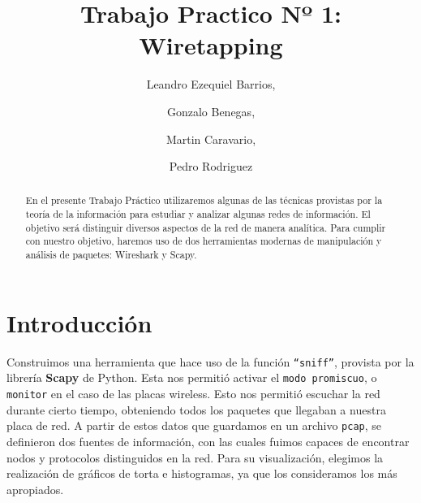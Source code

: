 \documentclass[final,narroweqnarray,inline]{ieee}
\begin{document}
\title[Trabajo Practico Nº 1: Wiretapping]{%
       Trabajo Practico Nº 1: Wiretapping}

\author[SHORT NAMES]{%
	Leandro Ezequiel Barrios,
	\and
	Gonzalo Benegas,
	\and
	Martin Caravario, 
	\and
	Pedro Rodriguez 
}

\maketitle               

\begin{abstract}
En el presente Trabajo Práctico utilizaremos algunas de las técnicas
provistas por la teoría de la información para estudiar y analizar algunas
redes de información. El objetivo será distinguir diversos aspectos de la
red de manera analítica. Para cumplir con nuestro objetivo, haremos uso de
dos herramientas modernas de manipulación y análisis de paquetes: Wireshark
y Scapy.
\end{abstract}



%
\section{ Introducción }

Construimos una herramienta que hace uso de la función
\texttt{``sniff''}, provista por la librería \textbf{Scapy} de
Python. Esta nos permitió activar el \texttt{modo promiscuo}, o
\texttt{monitor} en el caso de las placas wireless. Esto nos permitió
escuchar la red durante cierto tiempo, obteniendo todos los paquetes
que llegaban a nuestra placa de red. A partir de estos datos que
guardamos en un archivo \texttt{pcap}, se definieron dos fuentes de
información, con las cuales fuimos capaces de encontrar nodos y
protocolos distinguidos en la red. Para su visualización, elegimos la
realización de gráficos de torta e histogramas, ya que los
consideramos los más apropiados.
\end{document}
